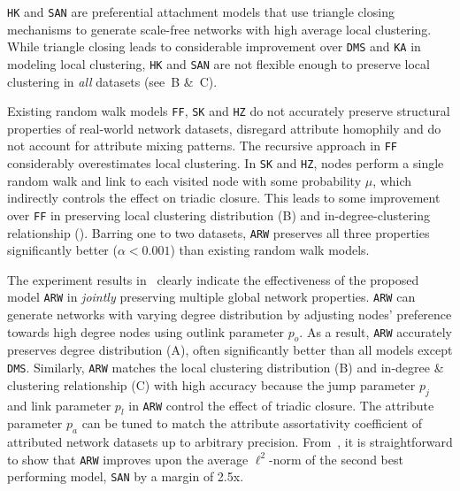 \texttt{HK} and \texttt{SAN} are preferential attachment models
that use triangle closing mechanisms to generate scale-free networks with high average
local clustering.
While triangle closing leads to considerable improvement over \texttt{DMS}
and \texttt{KA} in modeling local clustering, \texttt{HK} and \texttt{SAN} are not flexible enough
to preserve local clustering in \textit{all} datasets (see~B \&~C).

Existing random walk models \texttt{FF}, \texttt{SK} and \texttt{HZ}
do not accurately preserve structural properties of real-world network datasets,
disregard attribute homophily and do not account for attribute mixing patterns.
The recursive approach in \texttt{FF} considerably overestimates local clustering.
In \texttt{SK} and \texttt{HZ}, nodes perform a single random walk and link to
each visited node with some probability $\mu$, which indirectly
controls the effect on triadic closure. This leads to some improvement over \texttt{FF} in preserving local
clustering distribution (B) and in-degree-clustering relationship ().
Barring one to two datasets, \texttt{ARW} preserves all three properties significantly
better ($\alpha < 0.001$) than existing random walk models.

The experiment results in~ clearly indicate the effectiveness
of the proposed model \texttt{ARW} in \textit{jointly} preserving multiple
global network properties. \texttt{ARW} can generate networks with varying
degree distribution by adjusting nodes' preference towards high degree nodes
using outlink parameter $p_o$. As a result, \texttt{ARW} accurately preserves
degree distribution (A), often significantly better
than all models except \texttt{DMS}. Similarly, \texttt{ARW} matches the local clustering
distribution  (B) and in-degree \& clustering relationship
(C) with high accuracy because the jump parameter $p_j$ and
link parameter $p_l$ in \texttt{ARW} control the effect of triadic closure.
The attribute parameter $p_a$ can be tuned to match the attribute assortativity
coefficient of attributed network datasets up to arbitrary precision.
From~, it is straightforward to show that
\texttt{ARW} improves upon the average $\ell^2$-norm of the second best performing model,
\texttt{SAN} by a margin of 2.5x.


